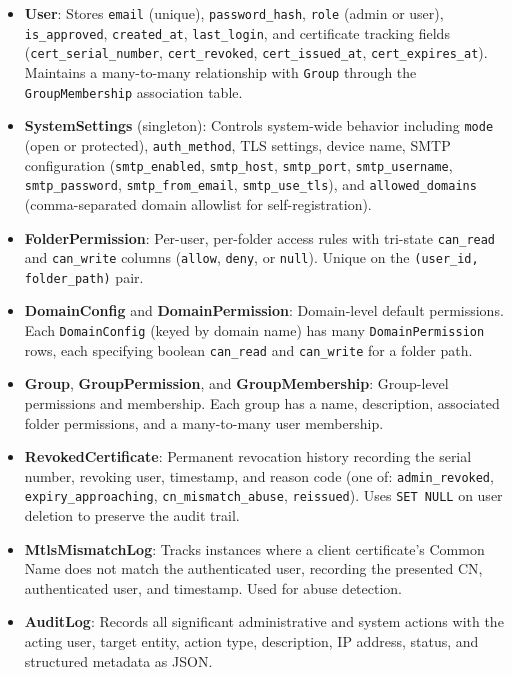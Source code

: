 \documentclass[12pt,letterpaper]{report}
\begin{document}
\begin{itemize}
    \item \textbf{User}: Stores \texttt{email} (unique), \texttt{password\_hash}, \texttt{role} (admin or user), \texttt{is\_approved}, \texttt{created\_at}, \texttt{last\_login}, and certificate tracking fields (\texttt{cert\_serial\_number}, \texttt{cert\_revoked}, \texttt{cert\_issued\_at}, \texttt{cert\_expires\_at}). Maintains a many-to-many relationship with \texttt{Group} through the \texttt{GroupMembership} association table.

    \item \textbf{SystemSettings} (singleton): Controls system-wide behavior including \texttt{mode} (open or protected), \texttt{auth\_method}, TLS settings, device name, SMTP configuration (\texttt{smtp\_enabled}, \texttt{smtp\_host}, \texttt{smtp\_port}, \texttt{smtp\_username}, \texttt{smtp\_password}, \texttt{smtp\_from\_email}, \texttt{smtp\_use\_tls}), and \texttt{allowed\_domains} (comma-separated domain allowlist for self-registration).

    \item \textbf{FolderPermission}: Per-user, per-folder access rules with tri-state \texttt{can\_read} and \texttt{can\_write} columns (\texttt{allow}, \texttt{deny}, or \texttt{null}). Unique on the \texttt{(user\_id, folder\_path)} pair.

    \item \textbf{DomainConfig} and \textbf{DomainPermission}: Domain-level default permissions. Each \texttt{DomainConfig} (keyed by domain name) has many \texttt{DomainPermission} rows, each specifying boolean \texttt{can\_read} and \texttt{can\_write} for a folder path.

    \item \textbf{Group}, \textbf{GroupPermission}, and \textbf{GroupMembership}: Group-level permissions and membership. Each group has a name, description, associated folder permissions, and a many-to-many user membership.

    \item \textbf{RevokedCertificate}: Permanent revocation history recording the serial number, revoking user, timestamp, and reason code (one of: \texttt{admin\_revoked}, \texttt{expiry\_approaching}, \texttt{cn\_mismatch\_abuse}, \texttt{reissued}). Uses \texttt{SET NULL} on user deletion to preserve the audit trail.

    \item \textbf{MtlsMismatchLog}: Tracks instances where a client certificate's Common Name does not match the authenticated user, recording the presented CN, authenticated user, and timestamp. Used for abuse detection.

    \item \textbf{AuditLog}: Records all significant administrative and system actions with the acting user, target entity, action type, description, IP address, status, and structured metadata as JSON.
\end{itemize}
\end{document}
